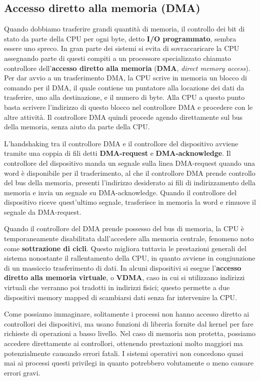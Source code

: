     \subsection{Accesso diretto alla memoria (DMA)}
        Quando dobbiamo trasferire grandi quantità di memoria, il controllo dei bit di stato da parte della CPU per ogni byte, detto \textbf{I/O programmato}, sembra essere uno spreco. In gran parte dei sistemi si evita di sovraccaricare la CPU assegnando parte di questi compiti a un processore specializzato chiamato controllore dell'\textbf{accesso diretto alla memoria} (\textbf{DMA}, \textit{direct memory access}). Per dar avvio a un trasferimento DMA, la CPU scrive in memoria un blocco di comando per il DMA, il quale contiene un puntatore alla locazione dei dati da trasferire, uno alla destinazione, e il numero di byte. Alla CPU a questo punto basta scrivere l'indirizzo di questo blocco nel controllore DMA e procedere con le altre attività. Il controllore DMA quindi procede agendo direttamente sul bus della memoria, senza aiuto da parte della CPU.
        
        L'handshaking tra il controllore DMA e il controllore del dispositivo avviene tramite una coppia di fili detti \textbf{DMA-request} e \textbf{DMA-acknowledge}. Il controllore del dispositivo manda un segnale sulla linea DMA-request quando una word è disponibile per il trasferimento, al che il controllore DMA prende controllo del bus della memoria, presenti l'indirizzo desiderato ai fili di indirizzamento della memoria e invia un segnale su DMA-acknowledge. Quando il controllore del dispositivo riceve quest'ultimo segnale, trasferisce in memoria la word e rimuove il segnale da DMA-request.
        
        Quando il controllore del DMA prende possesso del bus di memoria, la CPU è temporaneamente disabilitata dall'accedere alla memoria centrale, fenomeno noto come \textbf{sottrazione di cicli}. Questo migliora tuttavia le prestazioni generali del sistema nonostante il rallentamento della CPU, in quanto avviene in congiunzione di un massiccio trasferimento di dati. In alcuni dispositivi si esegue l'\textbf{accesso diretto alla memoria virtuale}, o \textbf{VDMA}, caso in cui si utilizzano indirizzi virtuali che verranno poi tradotti in indirizzi fisici; questo permette a due dispositivi memory mapped di scambiarsi dati senza far intervenire la CPU.
        
        Come possiamo immaginare, solitamente i processi non hanno accesso diretto ai controllori dei dispositivi, ma usano funzioni di libreria fornite dal kernel per fare richieste di operazioni a basso livello. Nel caso di memoria non protetta, possiamo accedere direttamente ai controllori, ottenendo prestazioni molto maggiori ma potenzialmente causando errori fatali. I sistemi operativi non concedono quasi mai ai processi questi privilegi in quanto potrebbero volutamente o meno causare errori gravi.
        
